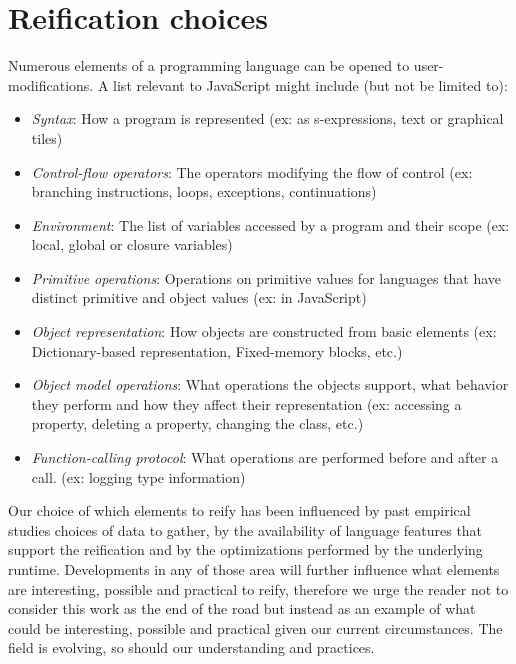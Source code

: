 \section{Reification choices}

Numerous elements of a programming language can be opened to
user-modifications. A list relevant to JavaScript might include (but not be
limited to):
\begin{itemize}
    \item \textit{Syntax}: How a program is represented (ex: as s-expressions,
    text or graphical tiles)
    \item \textit{Control-flow operators}: The operators modifying the flow of
    control (ex: branching instructions, loops, exceptions, continuations) 
    \item \textit{Environment}: The list of variables accessed by a program and
    their scope (ex: local, global or closure variables)
    \item \textit{Primitive operations}: Operations on primitive values for
    languages that have distinct primitive and object values (ex: \kw{+} in
    JavaScript) 
    \item \textit{Object representation}: How objects are constructed from
    basic elements (ex: Dictionary-based representation, Fixed-memory blocks, etc.)
    \item \textit{Object model operations}: What operations the objects
    support, what behavior they perform and how they affect their
    representation (ex: accessing a property, deleting a property, changing the
    class, etc.)
    \item \textit{Function-calling protocol}: What operations are performed
    before and after a call. (ex: logging type information)
\end{itemize}

Our choice of which elements to reify has been influenced by past empirical
studies choices of data to gather, by the availability of language features
that support the reification and by the optimizations performed by the
underlying runtime. Developments in any of those area will further influence
what elements are interesting, possible and practical to reify, therefore we
urge the reader not to consider this work as the end of the road but instead as
an example of what could be interesting, possible and practical given our
current circumstances. The field is evolving, so should our understanding and
practices.

